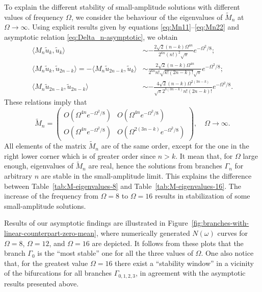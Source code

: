 To explain the different stability of small-amplitude solutions with different values of frequency $\Omega$, we consider the behaviour of the eigenvalues of $\widetilde{M}_n$ at $\Omega \to \infty$.
Using explicit results given by equations \eqref{eq:Mn11}--\eqref{eq:Mn22} and asymptotic relation \eqref{eq:Delta_n-asymptotic}, we obtain
\begin{align}
\langle M_n \tilde{u}_k, \tilde{u}_k \rangle & \sim -\frac{2\sqrt{2} (n - k) \Omega^{4n}}{2^{6n} (n!)^2 \sqrt{\pi}} e^{-\Omega^2 / 8}; \\
\langle M_n \tilde{u}_k, \tilde{u}_{2n-k} \rangle = -\langle M_n \tilde{u}_{2n-k}, \tilde{u}_k \rangle & \sim \frac{2\sqrt{2} (n - k) \Omega^{4n}}{2^{6n} n! \sqrt{k! (2n - k)!} \sqrt{\pi}} e^{-\Omega^2 / 8}; \\
\langle M_n \tilde{u}_{2n-k}, \tilde{u}_{2n-k} \rangle & \sim -\frac{4\sqrt{2} (n - k) \Omega^{2(3n - k)}}{\sqrt{\pi} 2^{3 (3n - k)} n! (2n - k)!} e^{-\Omega^2 / 8}.
\end{align}
These relations imply that
\begin{equation}
	\widetilde{M}_n =
	\begin{pmatrix}
		O(\Omega^{4n} e^{-\Omega^2 / 8}) & O(\Omega^{4n} e^{-\Omega^2 / 8}) \\
		O(\Omega^{4n} e^{-\Omega^2 / 8}) & O(\Omega^{2(3n-k)} e^{-\Omega^2 / 8})
	\end{pmatrix},
	\quad \Omega \to \infty.
\end{equation}
All elements of the matrix $\widetilde{M}_n$ are of the same order, except for the one in the right lower corner which is of greater order since $n > k$.
It mean that, for $\Omega$ large enough, eigenvalues of $\widetilde{M}_n$ are real, hence the solutions from branches $\Gamma_n$ for arbitrary $n$ are stable in the small-amplitude limit.
This explains the difference between Table~\ref{tab:M-eigenvalues-8} and Table~\ref{tab:M-eigenvalues-16}.
The increase of the frequency from $\Omega = 8$ to $\Omega = 16$ results in stabilization of some small-amplitude solutions. 

Results of our asymptotic findings are illustrated in Figure~\ref{fig:branches-with-linear-counterpart-zero-mean}, where numerically generated $N(\omega)$ curves for $\Omega = 8$, $\Omega = 12$, and $\Omega = 16$ are depicted.
It follows from these plots that the branch $\Gamma_0$ is the ``most stable'' one for all the three values of $\Omega$.
One also notice that, for the greatest value $\Omega = 16$ there exist a ``stability window'' in a vicinity of the bifurcations for all branches $\Gamma_{0,1,2,3}$, in agreement with the asymptotic results presented above.


